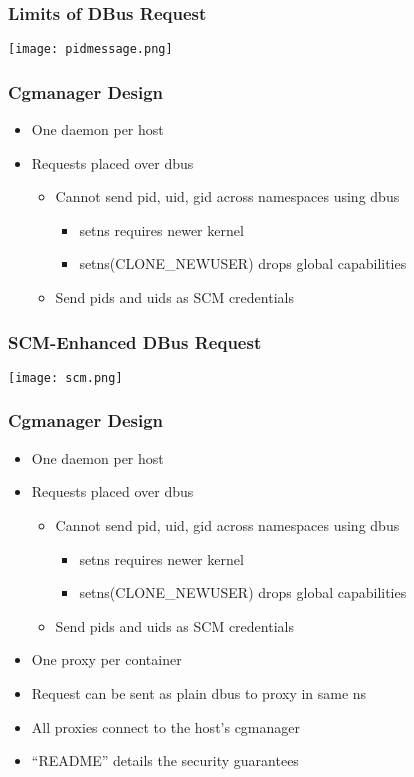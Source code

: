 \documentclass{beamer}
\begin{document}
\begin{frame}
\frametitle{Limits of DBus Request}
\texttt{[image: pidmessage.png]}
\end{frame}

\begin{frame}
\frametitle{Cgmanager Design}
\begin{itemize}
\item {\color{blue}One daemon per host}
\item {\color{blue}Requests placed over dbus}
	\begin{itemize}
	\item {\color{blue}Cannot send pid, uid, gid across namespaces using dbus}
		\begin{itemize}
		\item setns requires newer kernel
		\item setns(CLONE\_NEWUSER) drops global capabilities
		\end{itemize}
	\item Send pids and uids as SCM credentials
	\end{itemize}

\end{itemize}
\end{frame}

\begin{frame}
\frametitle{SCM-Enhanced DBus Request}
\texttt{[image: scm.png]}
\end{frame}

\begin{frame}
\frametitle{Cgmanager Design}
\begin{itemize}
\item {\color{blue}One daemon per host}
\item {\color{blue}Requests placed over dbus}
	\begin{itemize}
	\item {\color{blue}Cannot send pid, uid, gid across namespaces using dbus}
		\begin{itemize}
		\item {\color{blue}setns requires newer kernel}
		\item {\color{blue}setns(CLONE\_NEWUSER) drops global capabilities}
		\end{itemize}
	\item {\color{blue}Send pids and uids as SCM credentials}
	\end{itemize}
\item One proxy per container
\item Request can be sent as plain dbus to proxy in same ns
\item All proxies connect to the host's cgmanager
\item ``README'' details the security guarantees
\end{itemize}
\end{frame}
\end{document}
